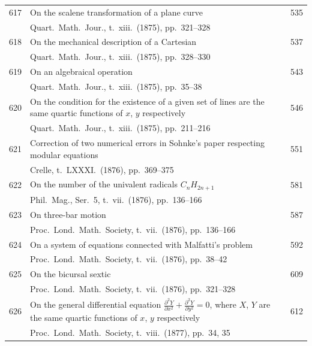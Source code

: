 \documentclass[11pt,a4paper]{book}
\begin{document}
\begin{longtable}{r @{. } p{4.8in} r}
617 & On the scalene transformation of a plane curve & 535 \\
  & Quart.\ Math.\ Jour., t.\ xiii.\ (1875), pp.\ 321--328 & \\ 

618 & On the mechanical description of a Cartesian & 537 \\
  & Quart.\ Math.\ Jour., t.\ xiii.\ (1875), pp.\ 328--330 & \\ 

619 & On an algebraical operation & 543 \\
  & Quart.\ Math.\ Jour., t.\ xiii.\ (1875), pp.\ 35--38 & \\ 

620 & On the condition for the existence of a given set of lines are the same quartic functions of $x$, $y$ respectively & 546 \\
  & Quart.\ Math.\ Jour., t.\ xiii.\ (1875), pp.\ 211--216 & \\ 

621 & Correction of two numerical errors in Sohnke's paper respecting modular equations & 551 \\
  & Crelle, t.\ LXXXI.\ (1876), pp.\ 369--375 & \\ 

622 & On the number of the univalent radicals $C_n H_{2n+1}$ & 581 \\
  & Phil.\ Mag., Ser.\ 5, t.\ vii.\ (1876), pp.\ 136--166 & \\ 

623 & On three-bar motion & 587 \\
  & Proc.\ Lond.\ Math.\ Society, t.\ vii.\ (1876), pp.\ 136--166 & \\ 

624 & On a system of equations connected with Malfatti's problem & 592 \\
  & Proc.\ Lond.\ Math.\ Society, t.\ vii.\ (1876), pp.\ 38--42 & \\ 

625 & On the bicursal sextic & 609 \\
  & Proc.\ Lond.\ Math.\ Society, t.\ vii.\ (1876), pp.\ 321--328 & \\ 

626 & On the general differential equation $\frac{\partial^2 Y}{\partial x^2} + \frac{\partial^2 Y}{\partial y^2} = 0$, where $X$, $Y$ are the same quartic functions of $x$, $y$ respectively & 612 \\
  & Proc.\ Lond.\ Math.\ Society, t.\ viii.\ (1877), pp.\ 34, 35 & \\ 


\end{longtable}
\end{document}
